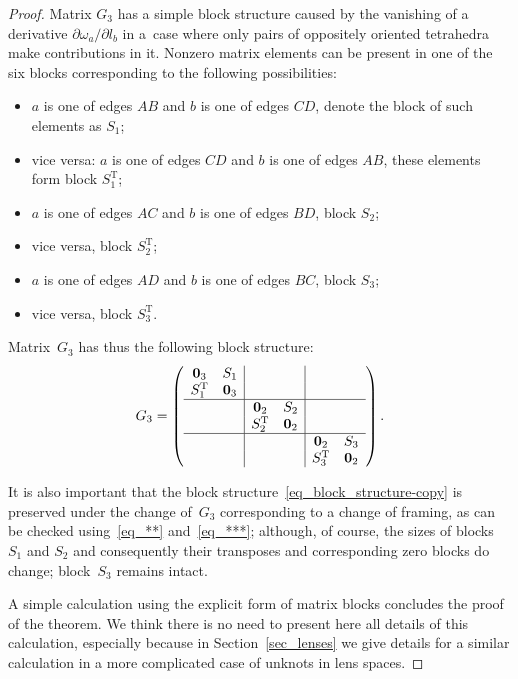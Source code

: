 \documentclass[pdftex]{sigma}
\begin{document}
\begin{proof}
Matrix $G_3$ has a simple block structure caused by the vanishing of a derivative $\partial \omega_a / \partial l_b$ in a~case where only pairs of oppositely oriented tetrahedra make contributions in it. Nonzero matrix elements can be present in one of the six blocks corresponding to the following possibilities:
\begin{itemize}
\itemsep=0pt
\item[(i)] $a$ is one of edges $AB$ and $b$ is one of edges $CD$, denote the block of such elements as $S_1$;
\item[(ii)] vice versa: $a$ is one of edges $CD$ and $b$ is one of edges $AB$, these elements form block $S_1^{\mathrm T}$;
\item[(iii)] $a$ is one of edges $AC$ and $b$ is one of edges $BD$, block $S_2$;
\item[(iv)] vice versa, block $S_2^{\mathrm T}$;
\item[(v)] $a$ is one of edges $AD$ and $b$ is one of edges $BC$, block $S_3$;
\item[(vi)] vice versa, block $S_3^{\mathrm T}$.
\end{itemize}
Matrix~$G_3$ has thus the following block structure:
\begin{equation}
G_3 = \left(\begin{array}{c c|c c|c c}{\bf 0}_3 & S_1 &  &  &  &  \\ S_1^{\rm T} & {\bf 0}_3 &  &  &  &  \\\hline  &  & {\bf 0}_2 & S_2 &  &  \\  &  & S_2^{\rm T} & {\bf 0}_2 &  &  \\\hline  &  &  &  & {\bf 0}_2 & S_3 \\  &  &  &  & S_3^{\rm T} &{\bf 0}_2 \end{array}\right).\label{eq_block_structure-copy}
\end{equation}

It is also important that the block structure~\eqref{eq_block_structure-copy} is preserved under the change of~$G_3$ corresponding to a change of framing, as can be checked using~\eqref{eq_**} and~\eqref{eq_***}; although, of course, the sizes of blocks $S_1$ and $S_2$ and consequently their transposes and corresponding zero blocks do change; block~$S_3$ remains intact.

A simple calculation using the explicit form of matrix blocks concludes the proof of the theorem. We think there is no need to present here all details of this calculation, especially because in Section~\ref{sec_lenses} we give details for a similar calculation in a more complicated case of unknots in lens spaces.
\end{proof}
\end{document}
